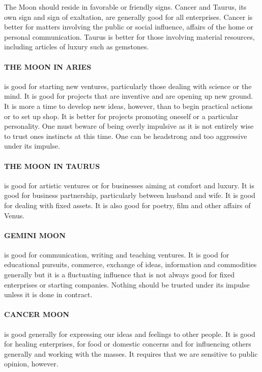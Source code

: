The Moon should reside in favorable or friendly signs. Cancer and Taurus, its own sign and sign of exaltation, are generally good for all enterprises. Cancer is better for matters involving the public or social influence, affairs of the home or personal communication. Taurus is better for those involving material resources, including articles of luxury such as gemstones.

 

\paragraph{THE MOON IN ARIES} is good for starting new ventures, particularly those dealing with science or the mind. It is good for projects that are inventive and are opening up new ground. It is more a time to develop new ideas, however, than to begin practical actions or to set up shop. It is better for projects promoting oneself or a particular personality. One must beware of being overly impulsive as it is not entirely wise to trust ones instincts at this time. One can be headstrong and too aggressive under its impulse.

 

\paragraph{THE MOON IN TAURUS} is good for artistic ventures or for businesses aiming at comfort and luxury. It is good for business partnership, particularly between husband and wife. It is good for dealing with fixed assets. It is also good for poetry, film and other affairs of Venus.

 

\paragraph{GEMINI MOON} is good for communication, writing and teaching ventures. It is good for educational pursuits, commerce, exchange of ideas, information and commodities generally but it is a fluctuating influence that is not always good for fixed enterprises or starting companies. Nothing should be trusted under its impulse unless it is done in contract.

 

\paragraph{CANCER MOON} is good generally for expressing our ideas and feelings to other people. It is good for healing enterprises, for food or domestic concerns and for influencing others generally and working with the masses. It requires that we are sensitive to public opinion, however.

